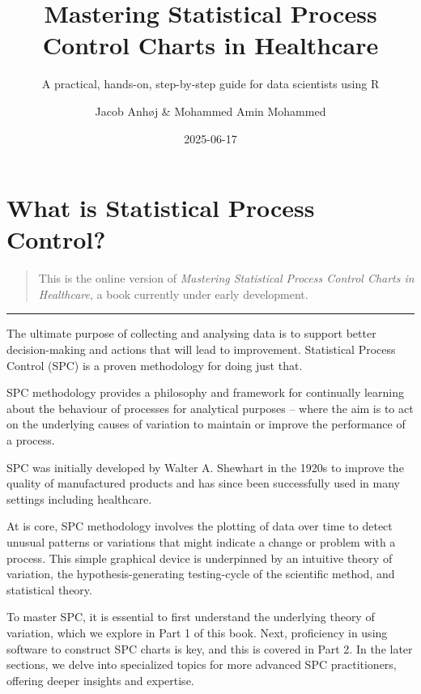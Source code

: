 \documentclass[
]{book}
\title{Mastering Statistical Process Control Charts in Healthcare}
\subtitle{A practical, hands-on, step-by-step guide for data scientists using R}
\author{Jacob Anhøj \& Mohammed Amin Mohammed}
\date{2025-06-17}
\begin{document}
\maketitle

{
\setcounter{tocdepth}{1}
\tableofcontents
}
\chapter*{What is Statistical Process Control?}\label{what}

\begin{quote}
This is the online version of \emph{Mastering Statistical Process Control Charts in Healthcare}, a book currently under early development.
\end{quote}

\begin{center}\rule{0.5\linewidth}{0.5pt}\end{center}

The ultimate purpose of collecting and analysing data is to support better decision-making and actions that will lead to improvement. Statistical Process Control (SPC) is a proven methodology for doing just that.

SPC methodology provides a philosophy and framework for continually learning about the behaviour of processes for analytical purposes -- where the aim is to act on the underlying causes of variation to maintain or improve the performance of a process.

SPC was initially developed by Walter A. Shewhart in the 1920s to improve the quality of manufactured products and has since been successfully used in many settings including healthcare.

At is core, SPC methodology involves the plotting of data over time to detect unusual patterns or variations that might indicate a change or problem with a process. This simple graphical device is underpinned by an intuitive theory of variation, the hypothesis-generating testing-cycle of the scientific method, and statistical theory.

To master SPC, it is essential to first understand the underlying theory of variation, which we explore in Part 1 of this book. Next, proficiency in using software to construct SPC charts is key, and this is covered in Part 2. In the later sections, we delve into specialized topics for more advanced SPC practitioners, offering deeper insights and expertise.
\end{document}
